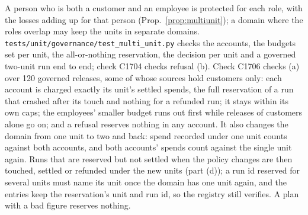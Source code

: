 \noindent A person who is both a customer and an employee is protected for each role, with the losses adding up for that person (Prop.~\ref{prop:multiunit}); a domain where the roles overlap may keep the units in separate domains. \texttt{tests/unit/governance/test\_multi\_unit.py} checks the accounts, the budgets set per unit, the all-or-nothing reservation, the decision per unit and a governed two-unit run end to end; check C1704 checks refusal (b). Check C1706 checks (a) over 120 governed releases, some of whose sources hold customers only: each account is charged exactly its unit's settled spends, the full reservation of a run that crashed after its touch and nothing for a refunded run; it stays within its own caps; the employees' smaller budget runs out first while releases of customers alone go on; and a refusal reserves nothing in any account. It also changes the domain from one unit to two and back: spend recorded under one unit counts against both accounts, and both accounts' spends count against the single unit again. Runs that are reserved but not settled when the policy changes are then touched, settled or refunded under the new units (part (d)); a run id reserved for several units must name its unit once the domain has one unit again, and the entries keep the reservation's unit and run id, so the registry still verifies. A plan with a bad figure reserves nothing.

\setcounter{proposition}{\value{savedpropunits}}
